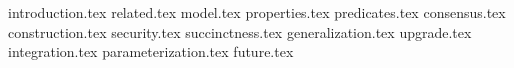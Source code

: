 {introduction.tex}
{related.tex}
{model.tex}
{properties.tex}
{predicates.tex}
{consensus.tex}
{construction.tex}
{security.tex}
{succinctness.tex}
{generalization.tex}
{upgrade.tex}
{integration.tex}
{parameterization.tex}
{future.tex}
